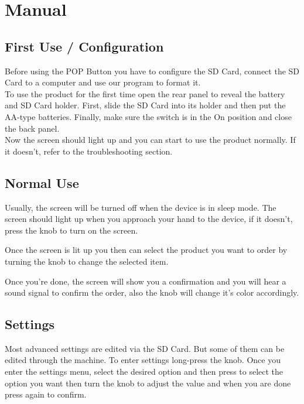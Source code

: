 \documentclass[12pt,a4paper,landscape]{article}
\begin{document}
\section*{Manual}
	\begin{multicols}{2}
		\subsection*{First Use / Configuration}
		Before using the POP Button you have to configure the SD Card, connect the SD Card to a computer and use our program to format it.\\
		To use the product for the first time open the rear panel to reveal the battery and SD Card holder. First, slide the SD Card into its holder and then put the AA-type batteries. Finally, make sure the switch is in the On position and close the back panel.\\
		Now the screen should light up and you can start to use the product normally. If it doesn't, refer to the troubleshooting section.
		\subsection*{Normal Use}
		Usually, the screen will be turned off when the device is in sleep mode. The screen should light up when you approach your hand to the device, if it doesn't, press the knob to turn on the screen.

		Once the screen is lit up you then can select the product you want to order by turning the knob to change the selected item.

		Once you're done, the screen will show you a confirmation and you will hear a sound signal to confirm the order, also the knob will change it's color accordingly.
		\subsection*{Settings}
		Most advanced settings are edited via the SD Card. But some of them can be edited through the machine.
		To enter settings long-press the knob. Once you enter the settings menu, select the desired option and then press to select the option you want then turn the knob to adjust the value and when you are done press again to confirm.

\end{multicols}
\end{document}
